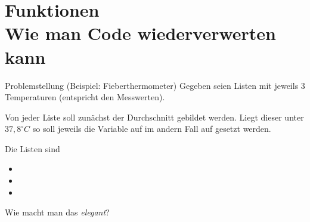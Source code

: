\section{Funktionen \\ \footnotesize Wie man Code wiederverwerten kann}
\begin{frame}
\begin{block}{Problemstellung (Beispiel: Fieberthermometer)}
	\vspace{2pt}
	Gegeben seien Listen mit jeweils 3 Temperaturen (entspricht den Messwerten). 

	\pause

	Von jeder Liste soll zunächst der Durchschnitt gebildet werden. 
    Liegt dieser unter $37,8^\circ C$ so soll jeweils die Variable  auf  im andern Fall auf 
	gesetzt werden. 
		
	\pause
Die Listen sind 
	\begin{itemize}
		\item {}
		\item {}
		\item {}
	\end{itemize}
\pause 
	Wie macht man das \emph{elegant}? 
\end{block}
\end{frame}
